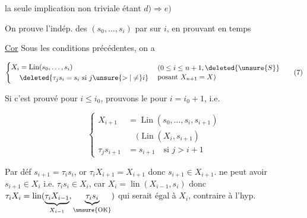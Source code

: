 
la seule implication non triviale étant $d)\Longrightarrow e)$

On prouve l'indép. des $(s_0,\ldots,s_i)$ par  sur $i$, en  prouvant en  temps

\uline{Cor} Sous les conditions précédentes, on a

\[
\left\{\begin{aligned}
X_i&=\operatorname{Lin}(s_0,\ldots,s_i)\\
&\deleted{\tau_j s_i=s_i\ \text{si }j\unsure{>|\ne}i}
\end{aligned}\right.\quad
\begin{aligned}&(0\leq i\leq n+1,\deleted{\unsure{S}}\\[-2pt]
 &\text{posant }X_{n+1}=X)\end{aligned}
\tag*{(7)}
\]

Si c'est prouvé pour  $i\leq i_0$, prouvons le pour $i=i_0+1$, i.e.

\[
\left\{\begin{aligned}
X_{i+1}&=\operatorname{Lin}(s_0,\ldots,s_i,s_{i+1})\\
&\quad\bigl(\operatorname{Lin}(X_i,s_{i+1})\\
\tau_j s_{i+1}&=s_{i+1}\quad\text{si }j>i+1
\end{aligned}\right.
\]


Par déf $s_{i+1}=\tau_i s_i$, or $\tau_i X_{i+1}=X_{i+1}$ donc \uline{$s_{i+1}\in X_{i+1}$}.   ne peut avoir $s_{i+1}\in X_i$ i.e. $\tau_i s_i\in X_i$, car  $X_i=\operatorname{lin}(X_{i-1},s_i)$ donc $\tau_iX_i=\operatorname{lin}(\underbrace{\tau_i X_{i-1}}_{X_{i-1}},\underbrace{\tau_i s_i}_{\unsure{\text{OK}}})$ qui serait égal à $X_i$, contraire à l'hyp. 

